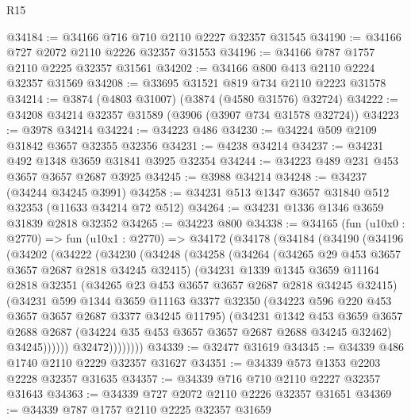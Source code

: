 \begin{lexlean}{R15}
\begin{coremodule}
@34184 := @34166 @716 @710 @2110 @2227 @32357 @31545
@34190 := @34166 @727 @2072 @2110 @2226 @32357 @31553
@34196 := @34166 @787 @1757 @2110 @2225 @32357 @31561
@34202 := @34166 @800 @413 @2110 @2224 @32357 @31569
@34208 := @33695 @31521 @819 @734 @2110 @2223 @31578
@34214 := @3874 (@4803 @31007) (@3874 (@4580 @31576) @32724)
@34222 := @34208 @34214 @32357 @31589 (@3906 (@3907 @734 @31578 @32724))
@34223 := @3978 @34214
@34224 := @34223 @486
@34230 := @34224 @509 @2109 @31842 @3657 @32355 @32356
@34231 := @4238 @34214
@34237 := @34231 @492 @1348 @3659 @31841 @3925 @32354
@34244 := @34223 @489 @231 @453 @3657 @3657 @2687 @3925
@34245 := @3988 @34214
@34248 := @34237 (@34244 @34245 @3991)
@34258 := @34231 @513 @1347 @3657 @31840 @512 @32353 (@11633 @34214 @72 @512)
@34264 := @34231 @1336 @1346 @3659 @31839 @2818 @32352
@34265 := @34223 @800
@34338 := @34165
    (fun (u10x0 : @2770) =>
    fun (u10x1 : @2770) =>
    @34172
      (@34178
        (@34184
          (@34190
            (@34196
              (@34202
                (@34222
                  (@34230
                    (@34248
                      (@34258
                        (@34264
                          (@34265 @29 @453 @3657 @3657 @2687 @2818 @34245 @32415)
                          (@34231
                            @1339
                            @1345
                            @3659
                            @11164
                            @2818
                            @32351
                            (@34265 @23 @453 @3657 @3657 @2687 @2818 @34245 @32415)
                            (@34231
                              @599
                              @1344
                              @3659
                              @11163
                              @3377
                              @32350
                              (@34223 @596 @220 @453 @3657 @3657 @2687 @3377 @34245 @11795)
                              (@34231
                                @1342
                                @453
                                @3659
                                @3657
                                @2688
                                @2687
                                (@34224 @35 @453 @3657 @3657 @2687 @2688 @34245 @32462)
                                @34245))))))
                    @32472))))))))
@34339 := @32477 @31619
@34345 := @34339 @486 @1740 @2110 @2229 @32357 @31627
@34351 := @34339 @573 @1353 @2203 @2228 @32357 @31635
@34357 := @34339 @716 @710 @2110 @2227 @32357 @31643
@34363 := @34339 @727 @2072 @2110 @2226 @32357 @31651
@34369 := @34339 @787 @1757 @2110 @2225 @32357 @31659

\end{coremodule}
\end{lexlean}

